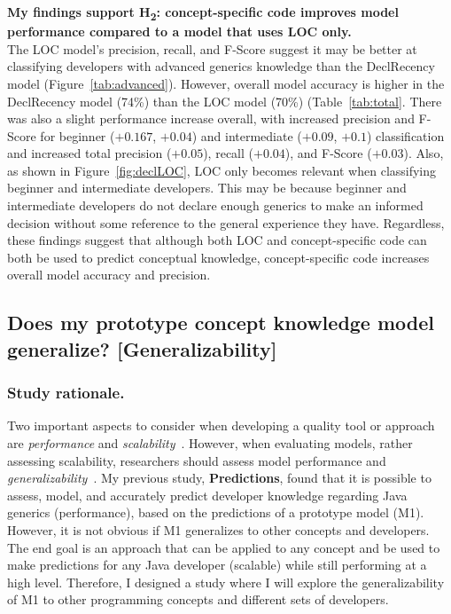 \documentclass{llncs}
\begin{document}
\noindent\textbf{My findings support H\textsubscript{2}: concept-specific code improves model performance compared to a model that uses LOC only.}\\
The LOC model's precision, recall, and F-Score suggest it may be better at classifying developers with advanced generics knowledge than the DeclRecency model (Figure~\ref{tab:advanced}). However, overall model accuracy is higher in the DeclRecency model (74\%) than the LOC model (70\%) (Table~\ref{tab:total}. There was also a slight performance increase overall, with increased precision and F-Score for beginner (\(+ 0.167\), \(+ 0.04\)) and intermediate (\(+ 0.09\), \(+ 0.1\)) classification and increased total precision (\(+ 0.05\)), recall (\(+ 0.04\)), and F-Score (\(+ 0.03\)). Also, as shown in Figure~\ref{fig:declLOC}, LOC only becomes relevant when classifying beginner and intermediate developers. This may be because beginner and intermediate developers do not declare enough generics to make an informed decision without some reference to the general experience they have.
Regardless, these findings suggest that although both LOC and concept-specific code can both be used to predict conceptual knowledge, concept-specific code increases overall model accuracy and precision.


\subsection{Does my prototype concept knowledge model generalize? [Generalizability]} \label{subsec:s4}

\subsubsection{Study rationale.} Two important aspects to consider when developing a quality tool or approach are \emph{performance} and \emph{scalability}~\cite{fox2011performance}. 
However, when evaluating models, rather assessing scalability, researchers should assess model performance and \textit{generalizability}~\cite{forster2000key}. 
My previous study, \textbf{Predictions}, found that it is possible to assess, model, and accurately predict developer knowledge regarding Java generics (performance), based on the predictions of a prototype model (M1). However, it is not obvious if M1 generalizes to other concepts and developers.
The end goal is an approach that can be applied to any concept and be used to make predictions for any Java developer (scalable) while still performing at a high level. Therefore, I designed a study where I will explore the generalizability of M1 to other programming concepts and different sets of developers. 
\end{document}
